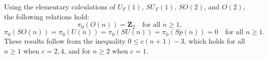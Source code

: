 Using the elementary calculations of $U_F(1)$, $SU_F(1)$, $SO(2)$, and $O(2)$, the following relations hold:
$$\pi_0(O(n)) = \mathbf{Z}_2 \quad \text{for all } n \geq 1,$$
$$\pi_0(SO(n)) = \pi_0(U(n)) = \pi_0(SU(n)) = \pi_0(Sp(n)) = 0 \quad \text{for all } n \geq 1.$$
These results follow from the inequality $0 \leq c(n+1)-3$, which holds for all $n \geq 1$ when $c = 2, 4$, and for $n \geq 2$ when $c = 1$.
